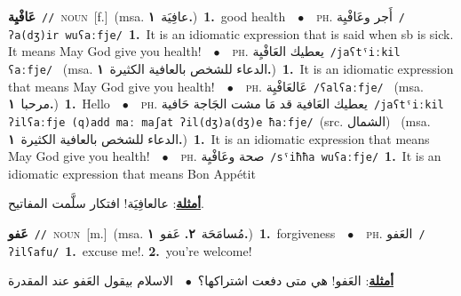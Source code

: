 \documentclass[10pt,a4paper,twoside]{article} %
\begin{document}
\begin{multicols}{2}
{\setlength\topsep{0pt}\textbf{\foreignlanguage{arabic}{عَافْيِة}}\ {\color{gray}\texttt{//}\color{black}}\ \textsc{noun}\ [f.]\ \color{gray}(msa. \foreignlanguage{arabic}{عافِيَة}~\foreignlanguage{arabic}{\textbf{١.}})\color{black}\ \textbf{1.}~good health\ \ $\bullet$\ \ \textsc{ph.} \color{gray} \foreignlanguage{arabic}{أَجر وعَافْيِة}\color{black}\ {\color{gray}\texttt{/{\sffamily ʔa(dʒ)ir wuʕaːfje}/}\color{black}}\ \textbf{1.}~It is an idiomatic expression that is said when sb is sick. It means May God give you health!\ \ $\bullet$\ \ \textsc{ph.} \color{gray} \foreignlanguage{arabic}{يعطيك العَافْيِة}\color{black}\ {\color{gray}\texttt{/{\sffamily jaʕtˤiːkil ʕaːfje}/}\color{black}}\ \color{gray} (msa. \foreignlanguage{arabic}{الدعاء للشخص بالعافية الكثيرة}~\foreignlanguage{arabic}{\textbf{١.}})\color{black}\ \textbf{1.}~It is an idiomatic expression that means May God give you health!\ \ $\bullet$\ \ \textsc{ph.} \color{gray} \foreignlanguage{arabic}{عَالعَافْيِة}\color{black}\ {\color{gray}\texttt{/{\sffamily ʕalʕaːfje}/}\color{black}}\ \color{gray} (msa. \foreignlanguage{arabic}{مرحبا}~\foreignlanguage{arabic}{\textbf{١.}})\color{black}\ \textbf{1.}~Hello\ \ $\bullet$\ \ \textsc{ph.} \color{gray} \foreignlanguage{arabic}{يعطيك العَافية قد مَا مشت الجَاجة حَافية}\color{black}\ {\color{gray}\texttt{/{\sffamily jaʕtˤiːkil ʔilʕaːfje (q)add maː maʃat ʔil(dʒ)a(dʒ)e ħaːfje}/}\color{black}}\ \color{gray}(src. \foreignlanguage{arabic}{الشمال})\color{black}\ \color{gray} (msa. \foreignlanguage{arabic}{الدعاء للشخص بالعافية الكثيرة}~\foreignlanguage{arabic}{\textbf{١.}})\color{black}\ \textbf{1.}~It is an idiomatic expression that means May God give you health!\ \ $\bullet$\ \ \textsc{ph.} \color{gray} \foreignlanguage{arabic}{صحة وعَافْيِة}\color{black}\ {\color{gray}\texttt{/{\sffamily sˤiħħa wuʕaːfje}/}\color{black}}\ \textbf{1.}~It is an idiomatic expression that means Bon Appétit\  \begin{flushright}\color{gray}\foreignlanguage{arabic}{\textbf{\underline{\foreignlanguage{arabic}{أمثلة}}}: عالعافِيَة! افتكار سلَّمت المفاتيح.}\end{flushright}\color{black}} \vspace{2mm}

{\setlength\topsep{0pt}\textbf{\foreignlanguage{arabic}{عَفو}}\ {\color{gray}\texttt{//}\color{black}}\ \textsc{noun}\ [m.]\ \color{gray}(msa. \foreignlanguage{arabic}{مُسامَحَة}~\foreignlanguage{arabic}{\textbf{٢.}}  \foreignlanguage{arabic}{عَفو}~\foreignlanguage{arabic}{\textbf{١.}})\color{black}\ \textbf{1.}~forgiveness\ \ $\bullet$\ \ \textsc{ph.} \color{gray} \foreignlanguage{arabic}{العَفو}\color{black}\ {\color{gray}\texttt{/{\sffamily ʔilʕafu}/}\color{black}}\ \textbf{1.}~excuse me!.  \textbf{2.}~you're welcome!\  \begin{flushright}\color{gray}\foreignlanguage{arabic}{\textbf{\underline{\foreignlanguage{arabic}{أمثلة}}}: العَفو! هي متى دفعت اشتراكها؟\ $\bullet$\ \  الاسلام بيقول العَفو عند المقدرة}\end{flushright}\color{black}} \vspace{2mm}


\end{multicols}
\end{document}
